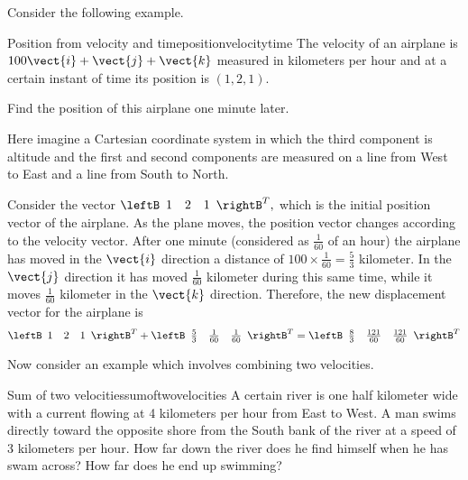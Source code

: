Consider the following example. 

\begin{example}{Position from velocity and time}{positionvelocitytime}
The velocity of an airplane is $100\vect{i}+\vect{j}+\vect{k}$
measured in kilometers per hour and at a certain instant of time its
position is $\left( 1,2,1\right) .$ 

Find the position of this airplane one minute later.
\end{example}

\begin{solution}
Here imagine a Cartesian coordinate
system in which the third component is altitude and the first and second
components are measured on a line from West to East and a line from South to
North. 

Consider the vector $
\leftB
\begin{array}{rrr}
1 & 2 & 1
\end{array}
\rightB^T ,$ which is the initial position vector
of the airplane. As the plane moves, the position vector changes according to the velocity vector. 
After one minute (considered as $\frac{1}{60}$ of an hour)
the airplane has moved in the $\vect{i}$ direction a distance of 
$100\times \frac{1}{60}= \frac{5}{3}$ kilometer. In the $\vect{j}
$ direction it has moved $\frac{1}{60}$ kilometer during this same time,
while it moves $\frac{1}{60}$ kilometer in the $\vect{k}$ direction.
Therefore, the new displacement vector for the airplane is
\begin{equation*}
\leftB 
\begin{array}{rrr}
1 & 2 & 1
\end{array}
\rightB^T +
\leftB 
\begin{array}{rrr}
\frac{5}{3} & \frac{1}{60} & \frac{1}{60}
\end{array}
\rightB^T
=\leftB 
\begin{array}{rrr}
\frac{8}{3} & \frac{121}{60} & \frac{121}{60}
\end{array}
\rightB^T
\end{equation*}
\end{solution}

Now consider an example which involves combining two velocities.

\begin{example}{Sum of two velocities}{sumoftwovelocities}
A certain river is one half kilometer wide with a current flowing at 4 kilometers per
hour from East to West. A man swims directly toward the opposite shore from
the South bank of the river at a speed of 3 kilometers per hour. How far down the
river does he find himself when he has swam across? How far does he end up
swimming?
\end{example}

